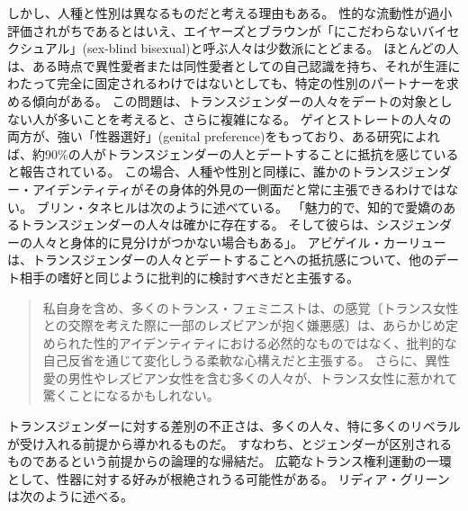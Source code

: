 \documentclass[paper=a4,book,openany]{jlreq}
\newcommand{\ig}[1]{}           %
\begin{document}
しかし、人種と性別は異なるものだと考える理由もある。
性的な流動性が過小評価されがちであるとはいえ、エイヤーズとブラウンが「にこだわらないバイセクシュアル」(sex-blind bisexual)と呼ぶ人々は少数派にとどまる。
ほとんどの人は、ある時点で異性愛者または同性愛者としての自己認識を持ち、それが生涯にわたって完全に固定されるわけではないとしても、特定の性別のパートナーを求める傾向がある。
この問題は、トランスジェンダーの人々をデートの対象としない人が多いことを考えると、さらに複雑になる。
ゲイとストレートの人々の両方が、強い「性器選好」(genital preference)をもっており、ある研究によれば、約90\%の人がトランスジェンダーの人とデートすることに抵抗を感じていると報告されている\citep{blair19:_trans_exclus_world_datin}。
この場合、人種や性別と同様に、誰かのトランスジェンダー・アイデンティティがその身体的外見の一側面だと常に主張できるわけではない。
ブリン・タネヒルは次のように述べている。
「魅力的で、知的で愛嬌のあるトランスジェンダーの人々は確かに存在する。
そして彼らは、シスジェンダーの人々と身体的に見分けがつかない場合もある」\citep{tannehill19:_is_refus_date}。
アビゲイル・カーリューは、トランスジェンダーの人々とデートすることへの抵抗感について、他のデート相手の嗜好と同じように批判的に検討すべきだと主張する。

\begin{quote}
私自身を含め、多くのトランス・フェミニストは、の感覚〔トランス女性との交際を考えた際に一部のレズビアンが抱く嫌悪感〕は、あらかじめ定められた性的アイデンティティにおける必然的なものではなく、批判的な自己反省を通じて変化しうる柔軟な心構えだと主張する。
さらに、異性愛の男性やレズビアン女性を含む多くの人々が、トランス女性に惹かれて驚くことになるかもしれない。
\citep{curlew18:_whats_wrong_no}
\end{quote}

トランスジェンダーに対する差別の不正さは、多くの人々、特に多くのリベラルが受け入れる前提から導かれるものだ。
すなわち、とジェンダーが区別されるものであるという前提からの論理的な帰結だ。
広範なトランス権利運動の一環として、性器に対する好みが根絶されうる可能性がある。
リディア・グリーン\ig{Lydia Green}は次のように述べる。
\end{document}
